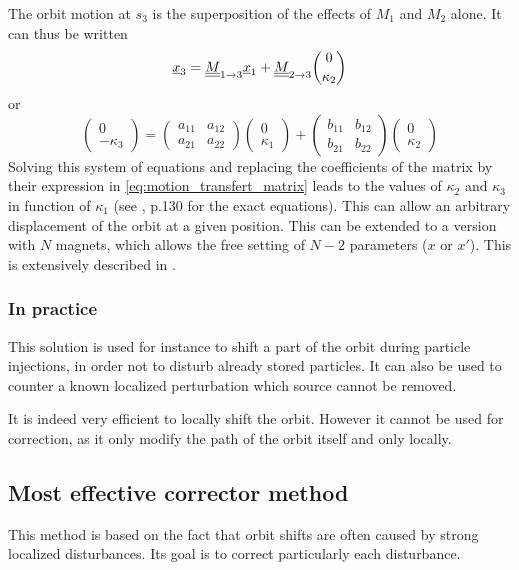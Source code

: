 The orbit motion at $s_3$ is the superposition of the effects of $M_1$ and $M_2$ alone. It can thus be written
\begin{equation}
\underline{x}_3 = \underline{\underline{M}}_{1 \rightarrow 3} \underline{x}_1 + \underline{\underline{M}}_{2 \rightarrow 3} \dbinom{0}{\kappa_2}
\end{equation}
or
\begin{equation*}
\begin{pmatrix} 0 \\ -\kappa_3 \end{pmatrix} =
\begin{pmatrix} a_{11} & a_{12} \\ a_{21} & a_{22} \end{pmatrix} \begin{pmatrix} 0 \\ \kappa_1 \end{pmatrix} +
\begin{pmatrix} b_{11} & b_{12} \\ b_{21} & b_{22} \end{pmatrix} \begin{pmatrix} 0 \\ \kappa_2 \end{pmatrix}
\end{equation*}
Solving this system of equations and replacing the coefficients of the matrix by their expression in \cref{eq:motion_transfert_matrix} leads to the values of $\kappa_2$ and $\kappa_3$ in function of $\kappa_1$ (see \cite{book:wille}, p.130 for the exact equations). This can allow an arbitrary displacement of the orbit at a given position. This can be extended to a version with $N$ magnets, which allows the free setting of $N-2$ parameters ($x$ or $x'$). This is extensively described in \cite{book:wille}.

\subsubsection{In practice}
This solution is used for instance to shift a part of the orbit during particle injections, in order not to disturb already stored particles. It can also be used to counter a known localized perturbation which source cannot be removed.

It is indeed very efficient to locally shift the orbit. However it cannot be used for correction, as it only modify the path of the orbit itself and only locally.

\subsection{Most effective corrector method}
\label{sec:most_effective_corr}
This method is based on the fact that orbit shifts are often caused by strong localized disturbances. Its goal is to correct particularly each disturbance.


